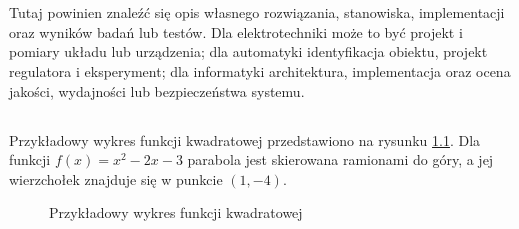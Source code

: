 \chapter{}

Tutaj powinien znaleźć się opis własnego rozwiązania, stanowiska, implementacji oraz wyników badań lub testów. Dla elektrotechniki może to być projekt i pomiary układu lub urządzenia; dla automatyki identyfikacja obiektu, projekt regulatora i eksperyment; dla informatyki architektura, implementacja oraz ocena jakości, wydajności lub bezpieczeństwa systemu.

\section{}

\section{}

\section{}

\section{}

Przykładowy wykres funkcji kwadratowej przedstawiono na rysunku \ref{fig:wykres-kwadratowej}. Dla funkcji
\(f(x)=x^2-2x-3\) parabola jest skierowana ramionami do góry, a jej wierzchołek znajduje się w punkcie
\((1,-4)\).

\begin{figure}[!ht]
  \centering
  \caption{Przykładowy wykres funkcji kwadratowej}
  \label{fig:wykres-kwadratowej}
\end{figure}

